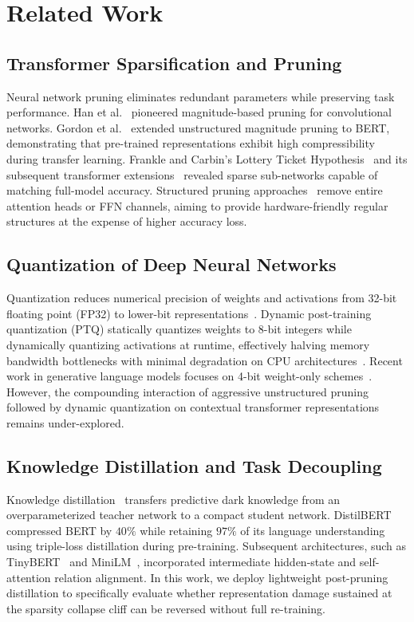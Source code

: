 \documentclass[conference]{IEEEtran}
\begin{document}
\section{Related Work}
\subsection{Transformer Sparsification and Pruning}
Neural network pruning eliminates redundant parameters while preserving task performance. Han et al.~\cite{han2015learning} pioneered magnitude-based pruning for convolutional networks. Gordon et al.~\cite{gordon2020compressing} extended unstructured magnitude pruning to BERT, demonstrating that pre-trained representations exhibit high compressibility during transfer learning. Frankle and Carbin's Lottery Ticket Hypothesis~\cite{frankle2018lottery} and its subsequent transformer extensions~\cite{chen2020lottery} revealed sparse sub-networks capable of matching full-model accuracy. Structured pruning approaches~\cite{michel2019sixteen,voita2019analyzing} remove entire attention heads or FFN channels, aiming to provide hardware-friendly regular structures at the expense of higher accuracy loss.

\subsection{Quantization of Deep Neural Networks}
Quantization reduces numerical precision of weights and activations from 32-bit floating point (FP32) to lower-bit representations~\cite{jacob2018quantization,nagel2021white}. Dynamic post-training quantization (PTQ) statically quantizes weights to 8-bit integers while dynamically quantizing activations at runtime, effectively halving memory bandwidth bottlenecks with minimal degradation on CPU architectures~\cite{zafrir2019q8bert,bhandare2019efficient}. Recent work in generative language models focuses on 4-bit weight-only schemes~\cite{frantar2022gptq,lin2023awq}. However, the compounding interaction of aggressive unstructured pruning followed by dynamic quantization on contextual transformer representations remains under-explored.

\subsection{Knowledge Distillation and Task Decoupling}
Knowledge distillation~\cite{hinton2015distilling} transfers predictive dark knowledge from an overparameterized teacher network to a compact student network. DistilBERT~\cite{sanh2019distilbert} compressed BERT by $40\%$ while retaining $97\%$ of its language understanding using triple-loss distillation during pre-training. Subsequent architectures, such as TinyBERT~\cite{jiao2019tinybert} and MiniLM~\cite{wang2020minilm}, incorporated intermediate hidden-state and self-attention relation alignment. In this work, we deploy lightweight post-pruning distillation to specifically evaluate whether representation damage sustained at the sparsity collapse cliff can be reversed without full re-training.
\end{document}
